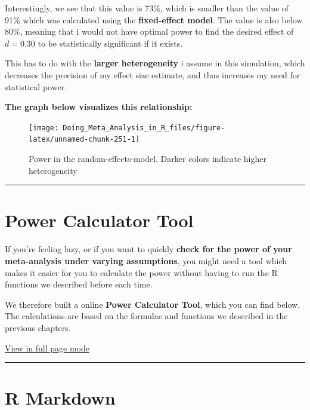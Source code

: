\documentclass[]{book}
\begin{document}
Interestingly, we see that this value is 73\%, which is smaller than the value of 91\% which was calculated using the \textbf{fixed-effect model}. The value is also below 80\%, meaning that i would not have optimal power to find the desired effect of \(d=0.30\) to be statistically significant if it exists.

This has to do with the \textbf{larger heterogeneity} i assume in this simulation, which decreases the precision of my effect size estimate, and thus increases my need for statistical power.

\textbf{The graph below visualizes this relationship:}

\begin{figure}

{\centering \texttt{[image: Doing\_Meta\_Analysis\_in\_R\_files/figure-latex/unnamed-chunk-251-1]} 

}

\caption{Power in the random-effects-model. Darker colors indicate higher heterogeneity}\label{fig:unnamed-chunk-251}
\end{figure}

\begin{center}\rule{0.5\linewidth}{\linethickness}\end{center}

\hypertarget{power-calculator-tool}{%
\section{Power Calculator Tool}\label{power-calculator-tool}}

If you're feeling lazy, or if you want to quickly \textbf{check for the power of your meta-analysis under varying assumptions}, you might need a tool which makes it easier for you to calculate the power without having to run the R functions we described before each time.

We therefore built a online \textbf{Power Calculator Tool}, which you can find below. The calculations are based on the formulae and functions we described in the previous chapters.

\href{https://mathiasharrer.shinyapps.io/power_calculator_meta_analysis/}{View in full page mode}

\begin{center}\rule{0.5\linewidth}{\linethickness}\end{center}

\hypertarget{r-markdown}{%
\section{R Markdown}\label{r-markdown}}
\end{document}
